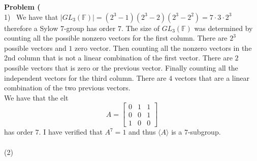 \documentclass[12pt]{article}
\newenvironment{ques}[1]{\textbf{Problem #1}\vspace{1 mm}\\ }{\bigskip}
\theoremstyle{definition}
\newcommand{\F}{\mathbb F}
\begin{document}
\begin{ques}{1.5}
	(1) \ We have that $|GL_3(\F)| = (2^3 - 1)(2^3 - 2)(2^3-2^2)= 7 \cdot 3 
	\cdot 2^3$ therefore a Sylow 7-group has order $7$. The size of $GL_3(\F)$
	was determined by counting all the possible nonzero vectors for the first
	column. There are $2^3$ possible vectors and $1$ zero vector. Then counting
	all the nonzero vectors in the 2nd column that is not
	a linear combination of the first vector. There are $2$ possible vectors
	that is zero or the previous vector. Finally counting all the independent
	vectors for the third column. There are $4$ vectors that are a linear
	combination of the two previous vectors.\\
	We have that the elt
	$$A = \begin{bmatrix}
		0 & 1 & 1 \\
		0 & 0 & 1 \\
		1 & 0 & 0
	\end{bmatrix}$$
	has order $7$. I have verified that $A^7 = 1$ and thus $\langle A \rangle$
	is a $7$-subgroup.\\
\\
	(2) \ 
\end{ques}
\end{document}
